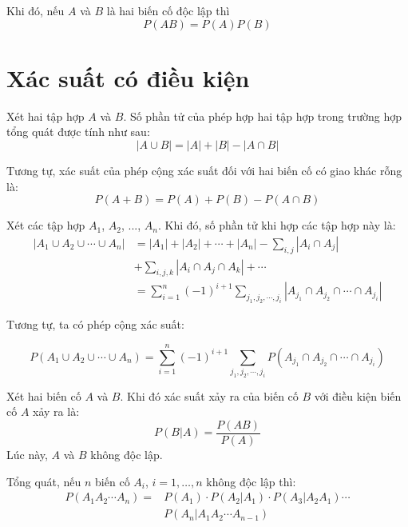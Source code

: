 \documentclass{mynotes}
\begin{document}
Khi đó, nếu $A$ và $B$ là hai biến cố độc lập thì \[P(AB) = P(A)P(B)\]    

\section{Xác suất có điều kiện}

Xét hai tập hợp $A$ và $B$. Số phần tử của phép hợp hai tập hợp trong trường hợp tổng quát được tính như sau: \[|A \cup B| = |A| + |B| - |A \cap B|\]
    
Tương tự, xác suất của phép cộng xác suất đối với hai biến cố có giao khác rỗng là: \[P(A + B) = P(A) + P(B) - P(A \cap B)\]

Xét các tập hợp $A_1$, $A_2$, ..., $A_n$. Khi đó, số phần tử khi hợp các tập hợp này là:
\begin{equation*}
    \begin{split}
        |A_1 \cup A_2 \cup \cdots \cup A_n| & = |A_1| + |A_2| + \cdots + |A_n| - \sum_{i, j}|A_i \cap A_j| \\ & + \sum_{i, j, k} |A_i \cap A_j \cap A_k| + \cdots \\ & = \sum_{i=1}^n (-1)^{i+1} \sum_{j_1, j_2, \cdots, j_i} |A_{j_1} \cap A_{j_2} \cap \cdots \cap A_{j_i} |
    \end{split}
\end{equation*}

Tương tự, ta có phép cộng xác suất:

\begin{theorem}
    \begin{equation*}
        P(A_1 \cup A_2 \cup \cdots \cup A_n) = \sum_{i=1}^n (-1)^{i+1} \sum_{j_1, j_2, \cdots, j_i} P(A_{j_1} \cap A_{j_2} \cap \cdots \cap A_{j_i})
    \end{equation*}
\end{theorem}

\begin{theorem}
    Xét hai biến cố $A$ và $B$. Khi đó xác suất xảy ra của biến cố $B$ với điều kiện biến cố $A$ xảy ra là: 
    \begin{equation}
        P(B | A) = \frac{P(AB)}{P(A)}
    \end{equation}
    Lúc này, $A$ và $B$ không độc lập.
\end{theorem}

Tổng quát, nếu $n$ biến cố $A_i$, $i=1, \ldots, n$ không độc lập thì:
\begin{align*}
    P(A_1 A_2 \cdots A_n) = & P(A_1) \cdot P(A_2|A_1) \cdot P(A_3 | A_2A_1) \cdots \\ & P(A_n|A_1A_2 \cdots A_{n-1})
\end{align*}
\end{document}

